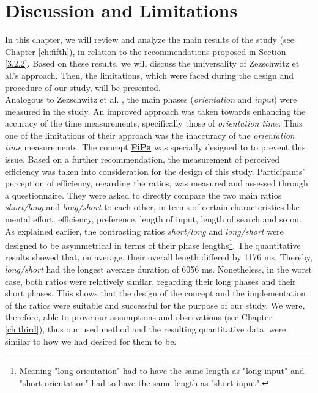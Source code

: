 
\chapter{Discussion and Limitations}\label{ch:sixth}

In this chapter, we will review and analyze the main results of the study (see Chapter \ref{ch:fifth}), in relation to the recommendations proposed in Section \ref{3.2.2}. Based on these results, we will discuss the universality of Zezschwitz et al.'s \cite{Zezschwitz} approach. Then, the limitations, which were faced during the design and procedure of our study, will be presented.\\

Analogous to Zezschwitz et al. \cite{Zezschwitz}, the main phases (\textit{orientation} and \textit{input}) were measured in the study. An improved approach was taken towards enhancing the accuracy of the time measurements, specifically those of \textit{orientation time}. Thus one of the limitations of their approach was the inaccuracy of the \textit{orientation time} measurements. The concept \underline{\textbf{FiPa}} was specially designed to to prevent this issue. Based on a further recommendation, the measurement of perceived efficiency was taken into consideration for the design of this study. Participants' perception of efficiency, regarding the ratios, was measured and assessed through a questionnaire. They were asked to directly compare the two main ratios \textit{short/long} and \textit{long/short} to each other, in terms of certain characteristics like mental effort, efficiency, preference, length of input, length of search and so on. \\

As explained earlier, the contrasting ratios \textit{short/long} and \textit{long/short} were designed to be asymmetrical in terms of their phase lengths\footnote{Meaning "long orientation" had to have the same length as "long input" and "short orientation" had to have the same length as "short input".}. The quantitative results showed that, on average, their overall length differed by 1176 ms. Thereby, \textit{long/short} had the longest average duration of 6056 ms.
Nonetheless, in the worst case, both ratios were relatively similar, regarding their long phases and their short phases. This shows that the design of the concept and the implementation of the ratios were suitable and successful for the purpose of our study. We were, therefore, able to prove our assumptions and observations (see Chapter \ref{ch:third}), thus our used method and the resulting quantitative data, were similar to how we had desired for them to be. \\

